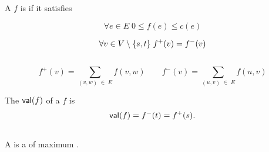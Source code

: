 \begin{frame}{}
  \begin{definition}
    A  $f$ is  if it satisfies
    \begin{description}
      \item[Capacity Constraints:]
        \[
          \forall e \in E\; 0 \le f(e) \le c(e)
        \]
      \item[Flow Conservation:]
        \[
          \forall v \in V \setminus \{s, t\}\; f^{+}(v) = f^{-}(v)
        \]
    \end{description}
  \end{definition}

  \begin{columns}
  \end{columns}

  \vspace{0.50cm}
  \[
    f^{+}(v) = \sum_{(v, w) \;\in\; E} f(v, w) \qquad
    f^{-}(v) = \sum_{(u, v) \;\in\; E} f(u, v)
  \]
\end{frame}

\begin{frame}{}
  \begin{definition}[Value (值)]
    The  $\textsf{val}(f)$ of a  $f$ is
    \[
      \textsf{val}(f) = f^{-}(t) = f^{+}(s).
    \]
  \end{definition}

  \vspace{0.30cm}
  \begin{columns}
      \pause
  \end{columns}

  \pause
  \vspace{0.50cm}
  \begin{definition}
    A  is a  of maximum .
  \end{definition}
\end{frame}

\begin{frame}{}
  \begin{columns}
      \pause
  \end{columns}
\end{frame}

